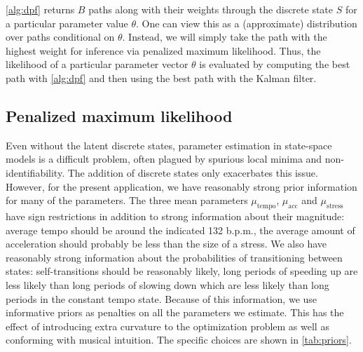 \documentclass[aoas]{imsart}
\begin{document}
\autoref{alg:dpf} returns $B$ paths along with their weights through
the discrete state $S$ for a 
particular parameter value $\theta$. One
can view this as a (approximate) distribution over paths conditional
on $\theta$. Instead, we will simply take the path with the highest
weight for inference via penalized maximum likelihood. Thus, the
likelihood of a particular parameter vector $\theta$ is evaluated by
computing the best path with \autoref{alg:dpf} and then using the best
path with the Kalman filter.%

\subsection{Penalized maximum likelihood}
\label{sec:penal-maxim-likel}

Even without the latent discrete states, parameter estimation in
state-space models is a difficult problem, often plagued by spurious
local minima and non-identifiability. The addition of discrete states
only exacerbates this issue. However, for the present application, we
have reasonably strong prior information for many of the
parameters. The three mean parameters $\mu_{\textrm{tempo}}$,
$\mu_{\textrm{acc}}$ and $\mu_{\textrm{stress}}$ have sign
restrictions in addition to strong information about their magnitude:
average tempo should be around the indicated 132 b.p.m., the average
amount of acceleration should probably be less than the size of a
stress. We also have reasonably strong information about the
probabilities of transitioning between states: self-transitions should
be reasonably likely, long periods of speeding up are less likely than
long periods of slowing down which are less likely than long periods
in the constant tempo state. Because of this information, we use
informative priors as penalties on all the parameters we
estimate. This has the effect of introducing extra curvature to the
optimization problem as well as conforming with musical intuition. The
specific choices are shown in \autoref{tab:priors}. 
\end{document}
